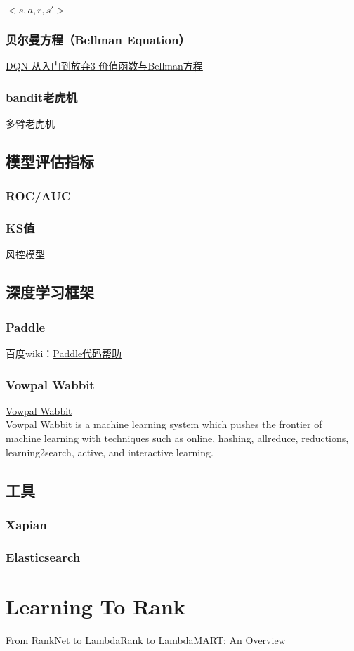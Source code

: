 \documentclass[UTF8,10pt,a4paper]{ctexbook}
\begin{document}
$<s, a, r, s'>$

\subsection{贝尔曼方程（Bellman Equation）}
\href{https://zhuanlan.zhihu.com/p/21340755?refer=intelligentunit}{DQN 从入门到放弃3 价值函数与Bellman方程}

\subsection{bandit老虎机}
多臂老虎机


\section{模型评估指标}
\subsection{ROC/AUC}
\subsection{KS值}
风控模型

\section{深度学习框架}
\subsection{Paddle}
百度wiki：\href{http://wiki.baidu.com/pages/viewpage.action?pageId=38550738}{Paddle代码帮助}

\subsection{Vowpal Wabbit}
\href{https://github.com/JohnLangford/vowpal_wabbit}{Vowpal Wabbit}
\\Vowpal Wabbit is a machine learning system which pushes the frontier of machine learning with techniques such as online, hashing, allreduce, reductions, learning2search, active, and interactive learning.


\section{工具}
\subsection{Xapian}
\subsection{Elasticsearch}

\chapter{Learning To Rank}
\href{https://www.microsoft.com/en-us/research/wp-content/uploads/2016/02/MSR-TR-2010-82.pdf}{From RankNet to LambdaRank to LambdaMART: An Overview}
\end{document}
